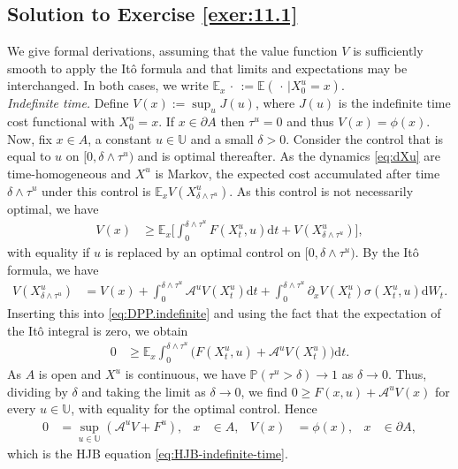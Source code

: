 \documentclass[12pt]{book}
\let\varphi\phi
\numberwithin{equation}{chapter}
\theoremstyle{plain}
\numberwithin{theorem}{section}
\theoremstyle{definition}
\numberwithin{exercise}{chapter}
\newcommand{\<}{\langle}
\renewcommand{\>}{\rangle}
\renewcommand{\(}{\left(}
\renewcommand{\)}{\right)}
\renewcommand{\[}{\left[}
\renewcommand{\]}{\right]}
\newcommand\Eb{\mathds{E}}
\newcommand\Pb{\mathds{P}}
\newcommand\Ub{\mathds{U}}
\newcommand\Ac{\mathscr{A}}
\newcommand\sig{\sigma}
\newcommand\del{\delta}
\renewcommand\d{\partial}
\newcommand\dd{\mathrm{d}}
\begin{document}
\subsection*{Solution to Exercise \ref{exer:11.1}}
We give formal derivations, assuming that the value function $V$ is sufficiently smooth to apply the It\^o formula and that limits and expectations may be interchanged.  In both cases, we write $\Eb_x \, \cdot \, := \Eb( \, \cdot \, | X_0^u = x)$.
\\[0.5em]
\textit{Indefinite time.}  Define $V(x) := \sup_{u} J(u)$, where $J(u)$ is the indefinite time cost functional with $X_0^u = x$.  If $x \in \d A$ then $\tau^u = 0$ and thus $V(x) = \varphi(x)$.  Now, fix $x \in A$, a constant $u \in \Ub$ and a small $\del > 0$.  Consider the control that is equal to $u$ on $[0,\del \wedge \tau^u)$ and is optimal thereafter.  As the dynamics \eqref{eq:dXu} are time-homogeneous and $X^u$ is Markov, the expected cost accumulated after time $\del \wedge \tau^u$ under this control is $\Eb_x V(X_{\del \wedge \tau^u}^u)$.  As this control is not necessarily optimal, we have
\begin{align}
V(x)
	&\geq \Eb_x \Big[ \int_0^{\del \wedge \tau^u} F(X_t^u,u) \dd t + V(X_{\del \wedge \tau^u}^u) \Big] , \label{eq:DPP.indefinite}
\end{align}
with equality if $u$ is replaced by an optimal control on $[0,\del \wedge \tau^u)$.  By the It\^o formula, we have
\begin{align}
V(X_{\del \wedge \tau^u}^u)
	&=	V(x) + \int_0^{\del \wedge \tau^u} \Ac^u V(X_t^u) \dd t + \int_0^{\del \wedge \tau^u} \d_x V(X_t^u) \sig(X_t^u,u) \dd W_t .
\end{align}
Inserting this into \eqref{eq:DPP.indefinite} and using the fact that the expectation of the It\^o integral is zero, we obtain
\begin{align}
0
	&\geq \Eb_x \int_0^{\del \wedge \tau^u} \Big( F(X_t^u,u) + \Ac^u V(X_t^u) \Big) \dd t .
\end{align}
As $A$ is open and $X^u$ is continuous, we have $\Pb(\tau^u > \del) \to 1$ as $\del \to 0$.  Thus, dividing by $\del$ and taking the limit as $\del \to 0$, we find $0 \geq F(x,u) + \Ac^u V(x)$ for every $u \in \Ub$, with equality for the optimal control.  Hence
\begin{align}
0
	&=	\sup_{u \in \Ub} ( \Ac^u V + F^u ) , &
x
	&\in A , &
V(x)
	&=	\varphi(x) , &
x
	&\in \d A ,
\end{align}
which is the HJB equation \eqref{eq:HJB-indefinite-time}.
\\[0.5em]
\end{document}
